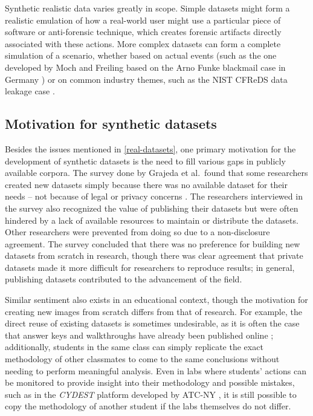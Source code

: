 \documentclass[letterpaper,12pt]{report}
\begin{document}
Synthetic realistic data varies greatly in scope. Simple datasets might
form a realistic emulation of how a real-world user might use a
particular piece of software or anti-forensic technique, which creates
forensic artifacts directly associated with these actions. More complex
datasets can form a complete simulation of a scenario, whether based on
actual events (such as the one developed by Moch and Freiling based on
the Arno Funke blackmail case in Germany
\cite{mochForensicImageGenerator2009}) or on common industry themes,
such as the NIST CFReDS data leakage case
\cite{nationalinstituteofstandardsandtechnologyCFReDSDataLeakage}.

\subsection{Motivation for synthetic
datasets}\label{motivation-for-synthetic-datasets}

Besides the issues mentioned in \autoref{real-datasets}, one primary motivation for the development of synthetic
datasets is the need to fill various gaps in publicly available corpora.
The survey done by Grajeda et al.~found that some researchers created
new datasets simply because there was no available dataset for their
needs -- not because of legal or privacy concerns
\cite{grajedaAvailabilityDatasetsDigital2017}. The researchers
interviewed in the survey also recognized the value of publishing their
datasets but were often hindered by a lack of available resources to
maintain or distribute the datasets. Other researchers were prevented
from doing so due to a non-disclosure agreement. The survey concluded
that there was no preference for building new datasets from scratch in
research, though there was clear agreement that private datasets made it
more difficult for researchers to reproduce results; in general,
publishing datasets contributed to the advancement of the field.

Similar sentiment also exists in an educational context, though the
motivation for creating new images from scratch differs from that of
research. For example, the direct reuse of existing datasets is
sometimes undesirable, as it is often the case that answer keys and
walkthroughs have already been published online
\cite{woodsCreatingRealisticCorpora2011}; additionally, students in
the same class can simply replicate the exact methodology of other
classmates to come to the same conclusions without needing to perform
meaningful analysis. Even in labs where students' actions can be
monitored to provide insight into their methodology and possible
mistakes, such as in the \emph{CYDEST} platform developed by ATC-NY
\cite{bruecknerAutomatedComputerForensics2008}, it is still possible
to copy the methodology of another student if the labs themselves do not
differ.
\end{document}
